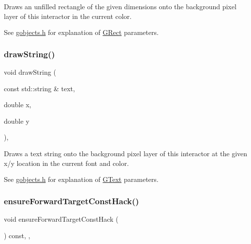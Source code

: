 Draws an unfilled rectangle of the given dimensions onto the background pixel layer of this interactor in the current color. 

See \mbox{\hyperlink{gobjects_8h_source}{gobjects.\+h}} for explanation of \mbox{\hyperlink{classsgl_1_1GRect}{G\+Rect}} parameters. \mbox{\label{classsgl_1_1GDrawingSurface_ad4e8551a753a77135792bbee97013675}} 
\subsubsection{\texorpdfstring{draw\+String()}{drawString()}}
{\footnotesize\ttfamily void draw\+String (\begin{DoxyParamCaption}\item[{const std\+::string \&}]{text,  }\item[{double}]{x,  }\item[{double}]{y }\end{DoxyParamCaption})\hspace{0.3cm}{\ttfamily [virtual]}, {\ttfamily [inherited]}}



Draws a text string onto the background pixel layer of this interactor at the given x/y location in the current font and color. 

See \mbox{\hyperlink{gobjects_8h_source}{gobjects.\+h}} for explanation of \mbox{\hyperlink{classsgl_1_1GText}{G\+Text}} parameters. \mbox{\label{classsgl_1_1GForwardDrawingSurface_a1b7188344977b67f01c452a6ba490992}} 
\subsubsection{\texorpdfstring{ensure\+Forward\+Target\+Const\+Hack()}{ensureForwardTargetConstHack()}}
{\footnotesize\ttfamily void ensure\+Forward\+Target\+Const\+Hack (\begin{DoxyParamCaption}{ }\end{DoxyParamCaption}) const\hspace{0.3cm}{\ttfamily [protected]}, {\ttfamily [virtual]}, {\ttfamily [inherited]}}

